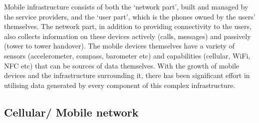 Mobile infrastructure consists of both the ‘network part’, built and managed by the service providers, and the ‘user part’, which is the phones owned by the users’ themselves.
The network part, in addition to providing connectivity to the users, also collects information on these devices actively (calls, messages) and passively (tower to tower handover).
The mobile devices themselves have a variety of sensors (accelerometer, compass, barometer etc) and capabilities (cellular, WiFi, NFC etc) that can be sources of data themselves.
With the growth of mobile devices and the infrastructure surrounding it, there has been significant effort in utilising data generated by every component of this complex infrastructure.

\subsection{Cellular/ Mobile network}

